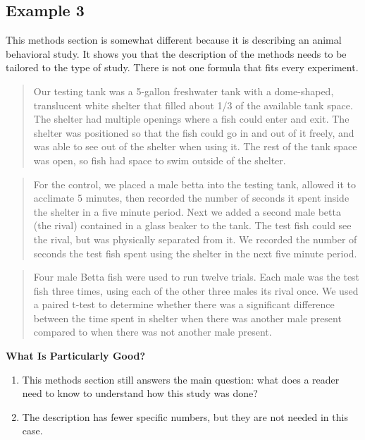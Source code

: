 \documentclass[
]{book}
\providecommand{\tightlist}{%
  \setlength{\itemsep}{0pt}\setlength{\parskip}{0pt}}
\begin{document}
\hypertarget{example-3-4}{%
\subsection{Example 3}\label{example-3-4}}

This methods section is somewhat different because it is describing an animal behavioral study. It shows you that the description of the methods needs to be tailored to the type of study. There is not one formula that fits every experiment.

\begin{quote}
Our testing tank was a 5-gallon freshwater tank with a dome-shaped, translucent white shelter that filled about 1/3 of the available tank space. The shelter had multiple openings where a fish could enter and exit. The shelter was positioned so that the fish could go in and out of it freely, and was able to see out of the shelter when using it. The rest of the tank space was open, so fish had space to swim outside of the shelter.
\end{quote}

\begin{quote}
For the control, we placed a male betta into the testing tank, allowed it to acclimate 5 minutes, then recorded the number of seconds it spent inside the shelter in a five minute period. Next we added a second male betta (the rival) contained in a glass beaker to the tank. The test fish could see the rival, but was physically separated from it. We recorded the number of seconds the test fish spent using the shelter in the next five minute period.
\end{quote}

\begin{quote}
Four male Betta fish were used to run twelve trials. Each male was the test fish three times, using each of the other three males its rival once. We used a paired t-test to determine whether there was a significant difference between the time spent in shelter when there was another male present compared to when there was not another male present.
\end{quote}

\textbf{What Is Particularly Good?}

\begin{enumerate}
\def\labelenumi{\arabic{enumi}.}
\tightlist
\item
  This methods section still answers the main question: what does a reader need to know to understand how this study was done?
\item
  The description has fewer specific numbers, but they are not needed in this case.
\end{enumerate}
\end{document}
